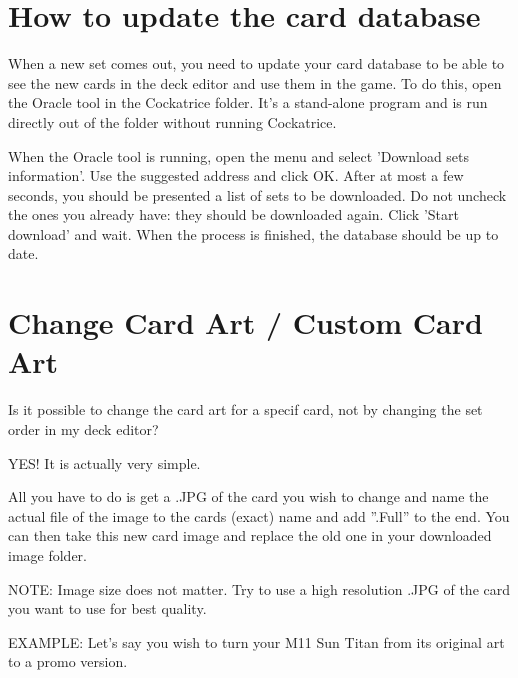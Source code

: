 \documentclass[a4paper]{scrbook}
\begin{document}
\section{How to update the card database}
When a new set comes out, you need to update your card database to be able to see the new cards in the deck editor and use them in the game. To do this, open the Oracle tool in the Cockatrice folder. It's a stand-alone program and is run directly out of the folder without running Cockatrice.

When the Oracle tool is running, open the menu and select 'Download sets information'. Use the suggested address and click OK. After at most a few seconds, you should be presented a list of sets to be downloaded. Do not uncheck the ones you already have: they should be downloaded again. Click 'Start download' and wait. When the process is finished, the database should be up to date.

\section{Change Card Art / Custom Card Art}
 Is it possible to change the card art for a specif card, not by changing the set order in my deck editor?

YES! It is actually very simple.

All you have to do is get a .JPG of the card you wish to change and name the actual file of the image to the cards (exact) name and add ”.Full” to the end. You can then take this new card image and replace the old one in your downloaded image folder.

NOTE: Image size does not matter. Try to use a high resolution .JPG of the card you want to use for best quality.

EXAMPLE: Let's say you wish to turn your M11 Sun Titan from its original art to a promo version.
\end{document}
